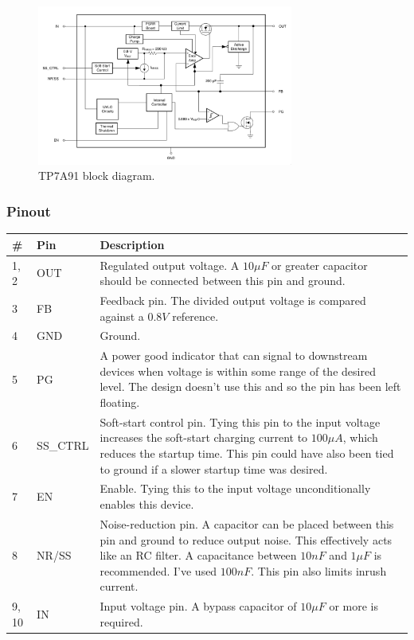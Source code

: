 \begin{figure}[h]
        \centering
        \includegraphics[width=0.75\textwidth]{data/tps7a91-block-diagram}
        \caption{TP7A91 block diagram.}
        \label{fig:tps7a91-block-diagram}
\end{figure}

\subsubsection{Pinout}
\label{sec:tps7a91-pinout}

\label{sec:tps7a91-pinout}
\begin{tabularx}{\textwidth}{l l X}
        \caption{TPS7A91 pinout.} \\
        \toprule
        \# & Pin & Description \\
        \midrule
        1, 2 & OUT & Regulated output voltage. A $10 \si{\mu F}$ or greater
        capacitor should be
        connected between this pin and ground. \\
        3 & FB & Feedback pin. The divided output voltage is compared against a $0.8 \si{V}$
        reference. \\
        4 & GND & Ground. \\
        5 & PG & A power good indicator that can signal to downstream devices when voltage is within
        some range of the desired level. The design doesn't use this and so the pin has been left
        floating. \\
        6 & SS\_CTRL & Soft-start control pin. Tying this pin to the input voltage increases the
        soft-start charging current to $100 \si{\mu A}$, which reduces the startup time. This pin
        could have also been tied to ground if a slower startup time was desired. \\
        7 & EN & Enable. Tying this to the input voltage unconditionally enables this device. \\
        8 & NR/SS & Noise-reduction pin. A capacitor can be placed between this pin and ground
        to reduce output noise. This effectively acts like an RC filter. A capacitance between $10
        \si{nF}$ and $1 \si{\mu F}$ is recommended. I've used $100 \si{nF}$. This pin also limits
        inrush current. \\
        9, 10 & IN & Input voltage pin. A bypass capacitor of $10 \si{\mu F}$ or more is
        required. \\
        \bottomrule
\end{tabularx}


